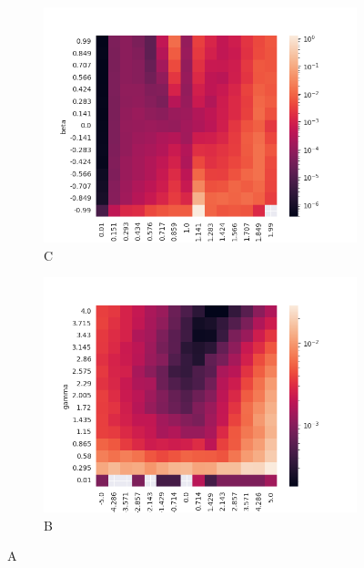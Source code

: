 \documentclass{article}
\begin{document}
		\begin{figure}[H]
			\begin{subfigure}{.5\textwidth}
				\centering
				\includegraphics[width=1\linewidth]{images/heatmap_cdf_MSE_alpha_beta.png}
				\caption{C}
			\end{subfigure}
			\begin{subfigure}[r]{.5\textwidth}
				\centering
				\includegraphics[width=1\linewidth]{images/heatmap_cdf_MSE_gamma_delta.png}
				\caption{B}
			\end{subfigure}
			\caption{A}
		\end{figure}
\end{document}
